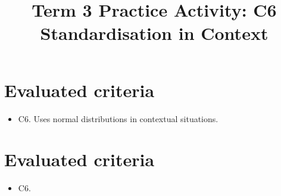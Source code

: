 \makeatletter
{}
\makeatother



\title{Term 3 Practice Activity: C6 Standardisation in Context}
\author{}
\date{}


	\maketitle
	
	\setcounter{tocdepth}{1}
	\setcounter{secnumdepth}{2}
	\tableofcontents
	
	\section*{Evaluated criteria}
	\begin{itemize}
		\item C6. Uses normal distributions in contextual situations.
	\end{itemize}

\maketitle
\tableofcontents
\section*{Evaluated criteria}\begin{itemize}\item C6.\end{itemize}

